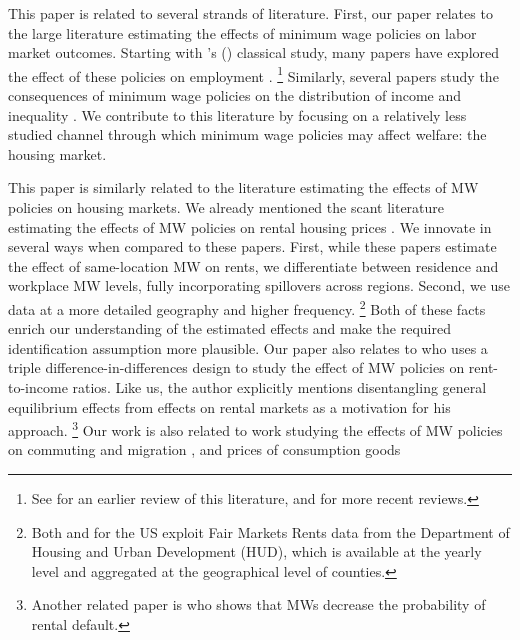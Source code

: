 
This paper is related to several strands of literature.
First, our paper relates to the large literature estimating the effects of 
minimum wage policies on labor market outcomes.
Starting with \citeauthor{CardKrueger1994}'s (\citeyear{CardKrueger1994}) classical 
study, many papers have explored the effect of these policies on employment
\parencite[some recent examples include][]{MeerWest2016,CegnizEtAl2019}.%
\footnote{See \textcite{Neumark2006} for an earlier review of this literature,
and \textcite{Dube2019, NeumarkShirley2021} for more recent reviews.}
Similarly, several papers study the consequences of minimum wage policies on the 
distribution of income and inequality \parencite{Lee1999, AutorEtAl2016}.
We contribute to this literature by focusing on a relatively less studied channel
through which minimum wage policies may affect welfare: the housing market.

This paper is similarly related to the literature estimating the effects of MW 
policies on housing markets.
We already mentioned the scant literature estimating the effects of MW policies
on rental housing prices \parencite{Tidemann2018, Yamagishi2021}.
We innovate in several ways when compared to these papers.
First, while these papers estimate the effect of same-location MW on rents, we 
differentiate between residence and workplace MW levels, fully incorporating
spillovers across regions.
Second, we use data at a more detailed geography and higher frequency.%
\footnote{Both \textcite{Tidemann2018} and \textcite{Yamagishi2019} for the US 
exploit Fair Markets Rents data from the Department of Housing and Urban 
Development (HUD), which is available at the yearly level and aggregated at the
geographical level of counties.}
Both of these facts enrich our understanding of the estimated effects and make 
the required identification assumption more plausible.
Our paper also relates to \textcite{Hughes2020} who uses a triple 
difference-in-differences design to study the effect of MW policies 
on rent-to-income ratios. Like us, the author explicitly mentions 
disentangling general equilibrium effects from effects on rental markets as 
a motivation for his approach. 
\footnote{Another related paper is \textcite{AgarwalEtAl2019} who shows that MWs
decrease the probability of rental default.}
Our work is also related to work studying the effects of MW policies on commuting
and migration \parencite{Cadena2014,Monras2019,PerezPerez2021}, and prices of 
consumption goods \parencite{AllegrettoReich2018,Leung2021}

